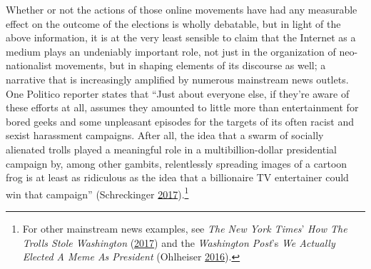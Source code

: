 \documentclass[10pt,british,A4paper,twoside]{memoir}
\begin{document}
Whether or not the actions of those online movements have had any
measurable effect on the outcome of the elections is wholly debatable,
but in light of the above information, it is at the very least sensible
to claim that the Internet as a medium plays an undeniably important role,
not just in the organization of neo-nationalist movements, but in
shaping elements of its discourse as well; a narrative that is
increasingly amplified by numerous mainstream news outlets. One Politico
reporter states that ``Just about everyone else, if they're aware of
these efforts at all, assumes they amounted to little more than
entertainment for bored geeks and some unpleasant episodes for the
targets of its often racist and sexist harassment campaigns. After all,
the idea that a swarm of socially alienated trolls played a meaningful
role in a multibillion-dollar presidential campaign by, among other
gambits, relentlessly spreading images of a cartoon frog is at least as
ridiculous as the idea that a billionaire TV entertainer could win that
campaign'' (Schreckinger
\protect\hyperlink{ref-schreckinger_world_2017}{2017}).\footnote{For
  other mainstream news examples, see \emph{The New York Times}'
  \emph{How The Trolls Stole Washington}
  (\protect\hyperlink{ref-hess_how_2017}{2017}) and the \emph{Washington
  Post}'s \emph{We Actually Elected A Meme As President} (Ohlheiser
  \protect\hyperlink{ref-ohlheiser_analysis_2016}{2016}).}
\end{document}
